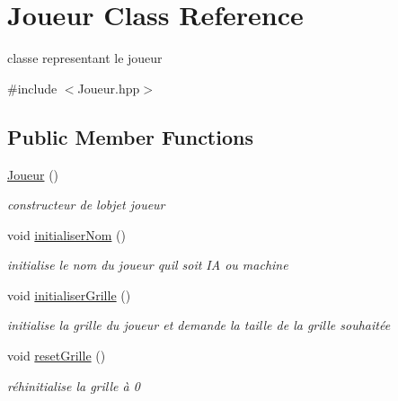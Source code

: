 \hypertarget{class_joueur}{}\section{Joueur Class Reference}
\label{class_joueur}


classe representant le joueur  




{\ttfamily \#include $<$Joueur.\+hpp$>$}

\subsection*{Public Member Functions}
\begin{DoxyCompactItemize}
\item 
\mbox{\label{class_joueur_a951f6cb508b2d681eac4be586b8aac5f}} 
\mbox{\hyperlink{class_joueur_a951f6cb508b2d681eac4be586b8aac5f}{Joueur}} ()
\begin{DoxyCompactList}\small\item\em constructeur de l\textquotesingle{}objet joueur \end{DoxyCompactList}\item 
\mbox{\label{class_joueur_a783216cfa2c14d498f28158d94cfcd5b}} 
void \mbox{\hyperlink{class_joueur_a783216cfa2c14d498f28158d94cfcd5b}{initialiser\+Nom}} ()
\begin{DoxyCompactList}\small\item\em initialise le nom du joueur qu\textquotesingle{}il soit IA ou machine \end{DoxyCompactList}\item 
\mbox{\label{class_joueur_a8688a9c5db313aa5260003b9baf93ff3}} 
void \mbox{\hyperlink{class_joueur_a8688a9c5db313aa5260003b9baf93ff3}{initialiser\+Grille}} ()
\begin{DoxyCompactList}\small\item\em initialise la grille du joueur et demande la taille de la grille souhaitée \end{DoxyCompactList}\item 
\mbox{\label{class_joueur_a1fec5128194cad6a1f487c2c144f629f}} 
void \mbox{\hyperlink{class_joueur_a1fec5128194cad6a1f487c2c144f629f}{reset\+Grille}} ()
\begin{DoxyCompactList}\small\item\em réhinitialise la grille à 0 \end{DoxyCompactList}\item 

\end{DoxyCompactItemize}
